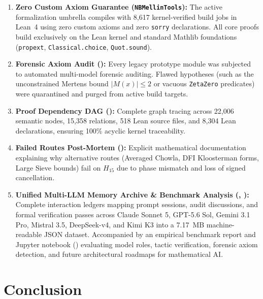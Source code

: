 \documentclass[11pt,a4paper]{article}
\theoremstyle{plain}
\theoremstyle{definition}
\theoremstyle{remark}
\begin{document}
\begin{enumerate}[leftmargin=2em]
  \item \textbf{Zero Custom Axiom Guarantee (\texttt{NBMellinTools}):} The active formalization umbrella compiles with 8,617 kernel-verified build jobs in Lean~4 using zero custom axioms and zero \texttt{sorry} declarations. All core proofs build exclusively on the Lean kernel and standard Mathlib foundations (\texttt{propext}, \texttt{Classical.choice}, \texttt{Quot.sound}).
  
  \item \textbf{Forensic Axiom Audit ():} Every legacy prototype module was subjected to automated multi-model forensic auditing. Flawed hypotheses (such as the unconstrained Mertens bound $|M(x)| \le 2$ or vacuous \texttt{ZetaZero} predicates) were quarantined and purged from active build targets.
  
  \item \textbf{Proof Dependency DAG ():} Complete graph tracing across 22,006 semantic nodes, 15,358 relations, 518 Lean source files, and 8,304 Lean declarations, ensuring 100\% acyclic kernel traceability.
  
  \item \textbf{Failed Routes Post-Mortem ():} Explicit mathematical documentation explaining why alternative routes (Averaged Chowla, DFI Kloosterman forms, Large Sieve bounds) fail on $H_{15}$ due to phase mismatch and loss of signed cancellation.
  
  \item \textbf{Unified Multi-LLM Memory Archive \& Benchmark Analysis (, ):} Complete interaction ledgers mapping prompt sessions, audit discussions, and formal verification passes across Claude Sonnet 5, GPT-5.6 Sol, Gemini 3.1 Pro, Mistral 3.5, DeepSeek-v4, and Kimi K3 into a 7.17~MB machine-readable JSON dataset. Accompanied by an empirical benchmark report and Jupyter notebook () evaluating model roles, tactic verification, forensic axiom detection, and future architectural roadmaps for mathematical AI.
\end{enumerate}

\section{Conclusion}
\label{sec:conclusion}
\end{document}

